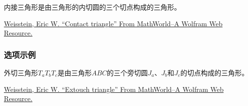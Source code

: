 \documentclass[../main.tex]{subfiles}
\begin{document}
内接三角形是由三角形的内切圆的三个切点构成的三角形。\par
\href{https://mathworld.wolfram.com/ContactTriangle.html}{Weisstein, Eric W.
\enquote{Contact triangle} From MathWorld--A Wolfram Web Resource.}


\begin{tkzexample}[latex=7cm,small]
\end{tkzexample}

\subsubsection{选项示例}

外切三角形$T_aT_bT_c$是由三角形$ABC$的三个旁切圆$J_a$、$J_b$和$J_c$的切点构成的三角形。\par
\href{https://mathworld.wolfram.com/ExtouchTriangle.html}{Weisstein, Eric W.
\enquote{Extouch triangle} From MathWorld--A Wolfram Web Resource.}
\end{document}
